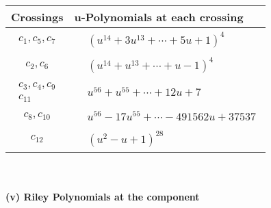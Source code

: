 \documentclass[1p]{elsarticle_modified}
\theoremstyle{definition}
\begin{document}
\begin{tabular}{m{50pt}|m{274pt}}
Crossings & \hspace{64pt}u-Polynomials at each crossing \\
\hline $$\begin{aligned}c_{1},c_{5},c_{7}\end{aligned}$$&$\begin{aligned}
&(u^{14}+3 u^{13}+\cdots+5 u+1)^{4}
\end{aligned}$\\
\hline $$\begin{aligned}c_{2},c_{6}\end{aligned}$$&$\begin{aligned}
&(u^{14}+u^{13}+\cdots+u-1)^{4}
\end{aligned}$\\
\hline $$\begin{aligned}c_{3},c_{4},c_{9}\\c_{11}\end{aligned}$$&$\begin{aligned}
&u^{56}+u^{55}+\cdots+12 u+7
\end{aligned}$\\
\hline $$\begin{aligned}c_{8},c_{10}\end{aligned}$$&$\begin{aligned}
&u^{56}-17 u^{55}+\cdots-491562 u+37537
\end{aligned}$\\
\hline $$\begin{aligned}c_{12}\end{aligned}$$&$\begin{aligned}
&(u^2- u+1)^{28}
\end{aligned}$\\
\hline
\end{tabular}\\~\\
\newpage\renewcommand{\arraystretch}{1}
\flushleft \textbf{(v) Riley Polynomials at the component}\newline \\
\end{document}
